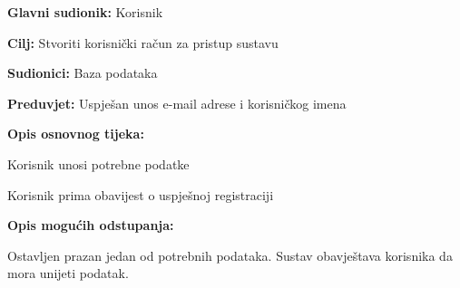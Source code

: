 					\noindent {}
					\begin{packed_item}
						
						\item \textbf{Glavni sudionik:} Korisnik
						\item  \textbf{Cilj:} Stvoriti korisnički račun za pristup sustavu
						\item  \textbf{Sudionici:} Baza podataka
						\item  \textbf{Preduvjet:} Uspješan unos e-mail adrese i korisničkog imena
						\item  \textbf{Opis osnovnog tijeka:}
						
						\item[] \begin{packed_enum}
							
							\item Korisnik unosi potrebne podatke
							\item Korisnik prima obavijest o uspješnoj registraciji
							
						\end{packed_enum}
						
						\item  \textbf{Opis mogućih odstupanja:}
						
						\item[] \begin{packed_item}
							
							\item[1.a] Ostavljen prazan jedan od potrebnih podataka. Sustav obavještava korisnika da mora unijeti podatak.
							
						\end{packed_item}
					\end{packed_item}
			
